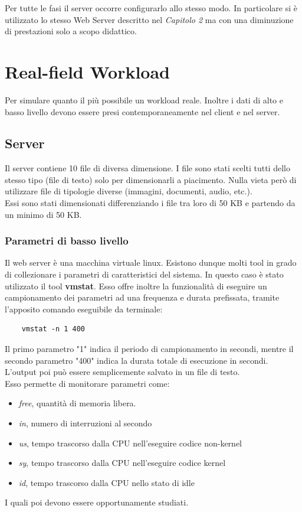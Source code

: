 Per tutte le fasi il server occorre configurarlo allo stesso modo. In particolare si è utilizzato lo stesso Web Server descritto nel \textit{Capitolo 2} ma con una diminuzione di prestazioni solo a scopo didattico.

\section{Real-field Workload}
Per simulare quanto il più possibile un workload reale. Inoltre i dati di alto e basso livello devono essere presi contemporaneamente nel client e nel server.
\subsection{Server}
Il server contiene 10 file di diversa dimensione. I file sono stati scelti tutti dello stesso tipo (file di testo) solo per dimensionarli a piacimento. Nulla vieta però di utilizzare file di tipologie diverse (immagini, documenti, audio, etc.).
\\Essi sono stati dimensionati differenziando i file tra loro di 50 KB e partendo da un minimo di 50 KB.

\subsubsection{Parametri di basso livello}
Il web server è una macchina virtuale linux. Esistono dunque molti tool in grado di collezionare i parametri di caratteristici del sistema. In questo caso è stato utilizzato il tool \textbf{vmstat}. Esso offre inoltre la funzionalità di eseguire un campionamento dei parametri ad una frequenza e durata prefissata, tramite l'apposito comando eseguibile da terminale:
\begin{verbatim}
	vmstat -n 1 400
\end{verbatim}
Il primo parametro "1" indica il periodo di campionamento in secondi, mentre il secondo parametro "400" indica la durata totale di esecuzione in secondi. L'output poi può essere semplicemente salvato in un file di testo.
\\Esso permette di monitorare parametri come:
\begin{itemize}
	\item \textit{free}, quantità di memoria libera.
	\item \textit{in}, numero di interruzioni al secondo
	\item \textit{us}, tempo trascorso dalla CPU nell'eseguire codice non-kernel
	\item \textit{sy}, tempo trascorso dalla CPU nell'eseguire codice kernel
	\item \textit{id}, tempo trascorso dalla CPU nello stato di idle
\end{itemize}
I quali poi devono essere opportunamente studiati.

